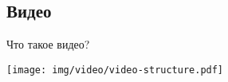 

\subsection{Видео}

\begin{frame}{Что такое видео?}
    \begin{center}
        \texttt{[image: img/video/video-structure.pdf]}
    \end{center}
\end{frame}


